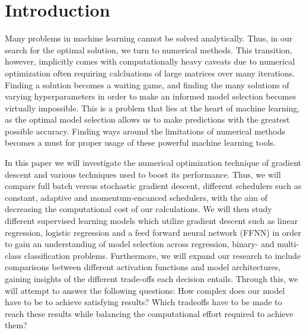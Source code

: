 \documentclass[onecolumn,10pt,cleanfoot]{asme2ej}
\begin{document}
%

\section{Introduction}

Many problems in machine learning cannot be solved analytically. Thus, in our search for the optimal solution, we turn to numerical methods. This transition, however, implicitly comes with computationally heavy caveats due to numerical optimization often requiring calcluations of large matrices over many iterations. Finding a solution becomes a waiting game, and finding the many solutions of varying hyperparameters in order to make an informed model selection becomes virtually impossible. This is a problem that lies at the heart of machine learning, as the optimal model selection allows us to make predictions with the greatest possible accuracy. Finding ways around the limitations of numerical methods becomes a must for proper usage of these powerful machine learning tools.

In this paper we will investigate the numerical optimization technique of gradient descent and various techniques used to boost its performance. Thus, we will compare full batch versus stochastic gradient descent, different schedulers such as constant, adaptive and momentum-encanced schedulers, with the aim of decreasing the computational cost of our calculations. We will then study different supervised learning models which utilize gradient descent such as linear regression, logistic regression and a feed forward neural network (FFNN) in order to gain an understanding of model selection across regression, binary- and multi-class classification problems. Furthermore, we will expand our research to include comparisons between different activation functions and model architectures, gaining insights of the different trade-offs each decision entails. Through this, we will attempt to answer the following questions: How complex does our model have to be to achieve satisfying results? Which tradeoffs have to be made to reach these results while balancing the computational effort required to achieve them?
\end{document}
